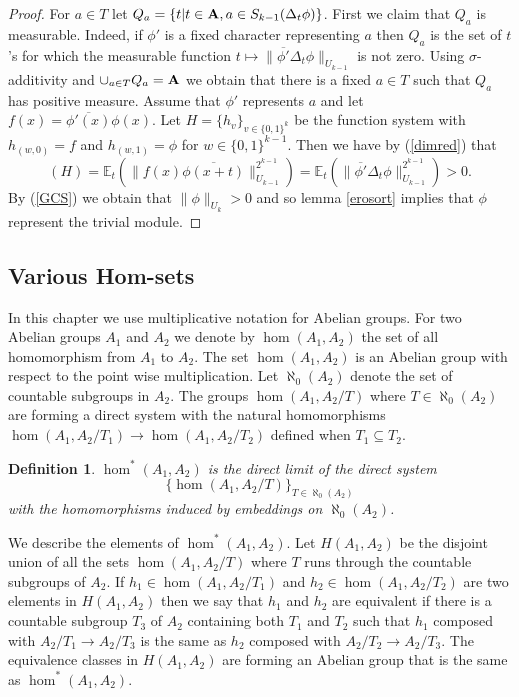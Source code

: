 \documentclass [11pt] {article}
\newtheorem{definition}{Definition}[section]
\def\bA{{\bf A}}
\begin{document}
\begin{proof} For $a\in T$ let $Q_a=\{t|t\in\bA,a\in S_{k-1}(\Delta_t\phi)\}$. First we claim that $Q_a$ is measurable. Indeed, if $\phi'$ is a fixed character representing $a$ then $Q_a$ is the set of $t$'s for which the measurable function $t\mapsto\|\overline{\phi'}\Delta_t\phi\|_{U_{k-1}}$ is not zero. Using $\sigma$-additivity and $\cup_{a\in T}Q_a=\bA$ we obtain that there is a fixed $a\in T$ such that $Q_a$ has positive measure.  Assume that $\phi'$ represents $a$ and let $f(x)=\overline{\phi'(x)}\phi(x)$. Let $H=\{h_v\}_{v\in\{0,1\}^k}$ be the function system with $h_{(w,0)}=f$ and $h_{(w,1)}=\phi$ for $w\in\{0,1\}^{k-1}$. Then we have by (\ref{dimred}) that  $$(H)=\mathbb{E}_t(\|f(x)\overline{\phi(x+t)}\|^{2^{k-1}}_{U_{k-1}})=\mathbb{E}_t(\|\overline{\phi'}\Delta_t\phi\|^{2^{k-1}}_{U_{k-1}})>0.$$ By (\ref{GCS}) we obtain that $\|\phi\|_{U_k}>0$ and so lemma \ref{erosort} implies that $\phi$ represent the trivial module.
\end{proof}

\subsection{Various Hom-sets}

In this chapter we use multiplicative notation for Abelian groups. For two Abelian groups $A_1$ and $A_2$ we denote by $\hom(A_1,A_2)$ the set of all homomorphism from $A_1$ to $A_2$. The set $\hom(A_1,A_2)$ is an Abelian group with respect to the point wise multiplication. Let $\aleph_0(A_2)$ denote the set of countable subgroups in $A_2$. The groups $\hom(A_1,A_2/T)$ where $T\in\aleph_0(A_2)$ are forming a direct system with the natural homomorphisms $\hom(A_1,A_2/T_1)\rightarrow\hom(A_1,A_2/T_2)$ defined when $T_1\subseteq T_2$.

\begin{definition} $\hom^*(A_1,A_2)$ is the direct limit of the direct system $$\{\hom(A_1,A_2/T)\}_{T\in\aleph_0(A_2)}$$
with the homomorphisms induced by embeddings on $\aleph_0(A_2)$.
\end{definition}

We describe the elements of $\hom^*(A_1,A_2)$.
Let $H(A_1,A_2)$ be the disjoint union of all the sets $\hom(A_1,A_2/T)$ where $T$ runs through the countable subgroups of $A_2$. If $h_1\in\hom(A_1,A_2/T_1)$ and $h_2\in\hom(A_1,A_2/T_2)$ are two elements in $H(A_1,A_2)$ then we say that $h_1$ and $h_2$ are equivalent if there is a countable subgroup $T_3$ of $A_2$ containing both $T_1$ and $T_2$ such that $h_1$ composed with $A_2/T_1\rightarrow A_2/T_3$ is the same as $h_2$ composed with $A_2/T_2\rightarrow A_2/T_3$.
The equivalence classes in $H(A_1,A_2)$ are forming an Abelian group that is the same as $\hom^*(A_1,A_2)$.
\end{document}
